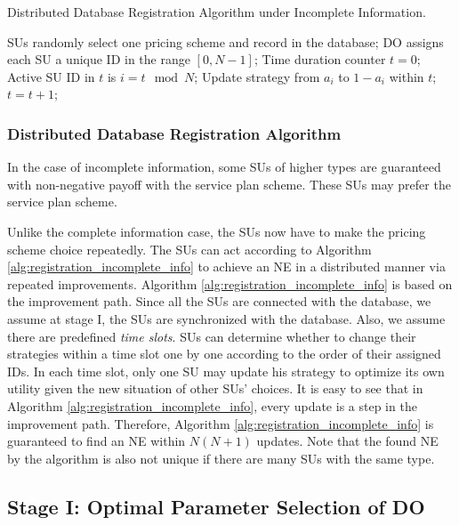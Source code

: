 \documentclass[journal]{IEEEtran}
\begin{document}
\begin{algorithm}[tp]
\caption {Distributed Database Registration Algorithm under Incomplete Information.}
\label{alg:registration_incomplete_info}
\begin{algorithmic}[1]
\STATE SUs randomly select one pricing scheme and record in the database;
\STATE DO assigns each SU a unique ID in the range $[0, N - 1]$;
\STATE Time duration counter $t=0$;
\STATE Active SU ID in $t$ is $i = t\mod N$;
\STATE Update strategy from $a_i$ to $1-a_i$ within $t$;
\ENDIF
\STATE $t=t+1$;
\ENDWHILE
\end{algorithmic}
\end{algorithm}

\subsubsection{Distributed Database Registration Algorithm}

In the case of incomplete information, some SUs of higher types are guaranteed with non-negative payoff with the service plan scheme. These SUs may prefer the service plan scheme.

Unlike the complete information case, the SUs now have to make the pricing scheme choice repeatedly. The SUs can act according to Algorithm \ref{alg:registration_incomplete_info} to achieve an NE in a distributed manner via repeated improvements. Algorithm \ref{alg:registration_incomplete_info} is based on the improvement path. Since all the SUs are connected with the database, we assume at stage I, the SUs are synchronized with the database. Also, we assume there are predefined \emph{time slots}. SUs can determine whether to change their strategies within a time slot one by one according to the order of their assigned IDs. In each time slot, only one SU may update his strategy to optimize its own utility given the new situation of other SUs' choices. It is easy to see that in Algorithm \ref{alg:registration_incomplete_info}, every update is a step in the improvement path. Therefore, Algorithm \ref{alg:registration_incomplete_info} is guaranteed to find an NE within $N(N+1)$ updates. Note that the found NE by the algorithm is also not unique if there are many SUs with the same type.

\subsection{Stage I: Optimal Parameter Selection of DO}
\end{document}
